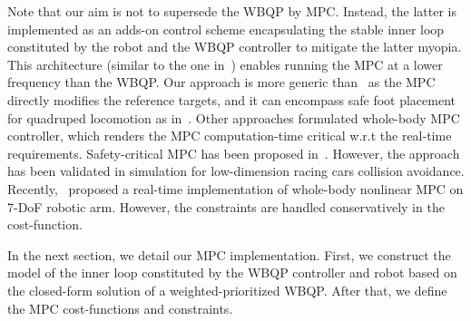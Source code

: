 Note that our aim is not to supersede the  WBQP by MPC. Instead, the latter is implemented as an adds-on control scheme encapsulating the stable inner loop constituted by the robot and the  WBQP controller to mitigate the latter myopia. This architecture (similar to the one in~\cite{grandia2021icra,tan2015robio}) enables running the MPC at a lower frequency than the WBQP. Our approach is more generic than~\cite{tan2015robio} as the MPC directly modifies the reference targets, and it can encompass safe foot placement for quadruped locomotion as in~\cite{grandia2021icra}. Other approaches formulated whole-body  MPC controller, which renders the MPC computation-time critical w.r.t the real-time requirements. Safety-critical MPC has been proposed in~\cite{zeng2021acc2}. However, the approach has been validated in simulation for low-dimension racing cars collision avoidance. Recently,~\cite{kleff2021icra} proposed a real-time implementation of whole-body nonlinear MPC on 7-DoF robotic arm. However, the constraints are handled conservatively in the cost-function.     

In the next section, we detail our MPC implementation. First, we construct the model of the inner loop constituted by the WBQP controller and robot based on the closed-form solution of a weighted-prioritized  WBQP. After that, we define the MPC cost-functions and constraints.

